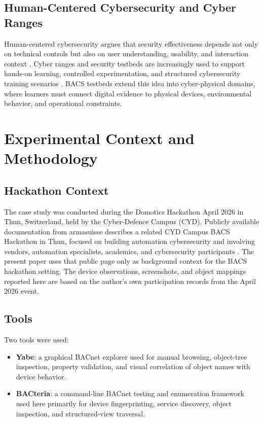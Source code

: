 \documentclass[10pt,conference]{IEEEtran}
\begin{document}
\subsection{Human-Centered Cybersecurity and Cyber Ranges}

Human-centered cybersecurity argues that security effectiveness depends not only on technical controls but also on user understanding, usability, and interaction context \cite{grobler2021human}. Cyber ranges and security testbeds are increasingly used to support hands-on learning, controlled experimentation, and structured cybersecurity training scenarios \cite{yamin2020cyberranges}. BACS testbeds extend this idea into cyber-physical domains, where learners must connect digital evidence to physical devices, environmental behavior, and operational constraints.

\section{Experimental Context and Methodology}

\subsection{Hackathon Context}

The case study was conducted during the Domotics Hackathon April 2026 in Thun, Switzerland, held by the Cyber-Defence Campus (CYD). Publicly available documentation from armasuisse describes a related CYD Campus BACS Hackathon in Thun, focused on building automation cybersecurity and involving vendors, automation specialists, academics, and cybersecurity participants \cite{armasuisse_bacs_2025}. The present paper uses that public page only as background context for the BACS hackathon setting. The device observations, screenshots, and object mappings reported here are based on the author's own participation records from the April 2026 event.

\subsection{Tools}

Two tools were used:

\begin{itemize}
    \item \textbf{Yabe}: a graphical BACnet explorer used for manual browsing, object-tree inspection, property validation, and visual correlation of object names with device behavior.
    \item \textbf{BACteria}: a command-line BACnet testing and enumeration framework used here primarily for device fingerprinting, service discovery, object inspection, and structured-view traversal.
\end{itemize}
\end{document}
